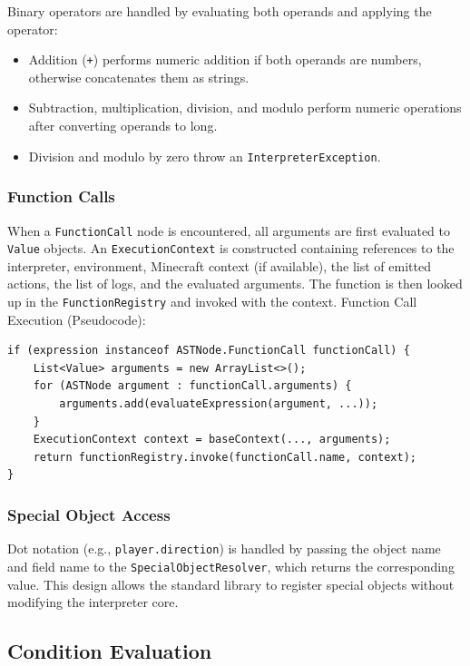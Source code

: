 Binary operators are handled by evaluating both operands and applying the operator:
\begin{itemize}
\item[--] Addition (\texttt{+}) performs numeric addition if both operands are numbers, otherwise concatenates them as strings.
\item[--] Subtraction, multiplication, division, and modulo perform numeric operations after converting operands to long.
\item[--] Division and modulo by zero throw an \texttt{InterpreterException}.
\end{itemize}

\subsubsection{Function Calls}

When a \texttt{FunctionCall} node is encountered, all arguments are first evaluated to \texttt{Value} objects.
An \texttt{ExecutionContext} is constructed containing references to the interpreter, environment, Minecraft context (if available), the list of emitted actions, the list of logs, and the evaluated arguments.
The function is then looked up in the \texttt{FunctionRegistry} and invoked with the context.
Function Call Execution (Pseudocode):

\begin{lstlisting}
if (expression instanceof ASTNode.FunctionCall functionCall) {
    List<Value> arguments = new ArrayList<>();
    for (ASTNode argument : functionCall.arguments) {
        arguments.add(evaluateExpression(argument, ...));
    }
    ExecutionContext context = baseContext(..., arguments);
    return functionRegistry.invoke(functionCall.name, context);
}
\end{lstlisting}

\subsubsection{Special Object Access}

Dot notation (e.g., \texttt{player.direction}) is handled by passing the object name and field name to the \texttt{SpecialObjectResolver}, which returns the corresponding value.
This design allows the standard library to register special objects without modifying the interpreter core.

\subsection{Condition Evaluation}

